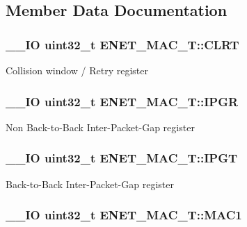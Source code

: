 \subsection{Member Data Documentation}
\hypertarget{struct_e_n_e_t___m_a_c___t_afdf0e932f04510c6e77bb13a4592cf13}{
\subsubsection[{C\+L\+R\+T}]{\setlength{\rightskip}{0pt plus 5cm}\+\_\+\+\_\+\+I\+O uint32\+\_\+t E\+N\+E\+T\+\_\+\+M\+A\+C\+\_\+\+T\+::\+C\+L\+R\+T}}\label{struct_e_n_e_t___m_a_c___t_afdf0e932f04510c6e77bb13a4592cf13}
Collision window / Retry register \hypertarget{struct_e_n_e_t___m_a_c___t_adcccddf8623def0f5a9aeee408312664}{
\subsubsection[{I\+P\+G\+R}]{\setlength{\rightskip}{0pt plus 5cm}\+\_\+\+\_\+\+I\+O uint32\+\_\+t E\+N\+E\+T\+\_\+\+M\+A\+C\+\_\+\+T\+::\+I\+P\+G\+R}}\label{struct_e_n_e_t___m_a_c___t_adcccddf8623def0f5a9aeee408312664}
Non Back-\/to-\/\+Back Inter-\/\+Packet-\/\+Gap register \hypertarget{struct_e_n_e_t___m_a_c___t_ac73d8d2cf290a3b9dc117340fc093d7e}{
\subsubsection[{I\+P\+G\+T}]{\setlength{\rightskip}{0pt plus 5cm}\+\_\+\+\_\+\+I\+O uint32\+\_\+t E\+N\+E\+T\+\_\+\+M\+A\+C\+\_\+\+T\+::\+I\+P\+G\+T}}\label{struct_e_n_e_t___m_a_c___t_ac73d8d2cf290a3b9dc117340fc093d7e}
Back-\/to-\/\+Back Inter-\/\+Packet-\/\+Gap register \hypertarget{struct_e_n_e_t___m_a_c___t_a1e758365774fda3ac9c11922c4a7ef35}{
\subsubsection[{M\+A\+C1}]{\setlength{\rightskip}{0pt plus 5cm}\+\_\+\+\_\+\+I\+O uint32\+\_\+t E\+N\+E\+T\+\_\+\+M\+A\+C\+\_\+\+T\+::\+M\+A\+C1}}\label{struct_e_n_e_t___m_a_c___t_a1e758365774fda3ac9c11922c4a7ef35}
